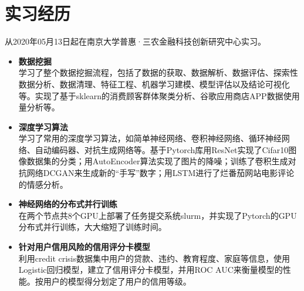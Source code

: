 \documentclass{resume}
\begin{document}
\section{实习经历}
从2020年05月13日起在南京大学普惠·三农金融科技创新研究中心实习。
\begin{itemize}%
\item \textbf{数据挖掘}\\
学习了整个数据挖掘流程，包括了数据的获取、数据解析、数据评估、探索性数据分析、数据清理、特征工程、机器学习建模、模型评估以及结论可视化等。实现了基于sklearn的消费顾客群体聚类分析、谷歌应用商店APP数据使用量分析等。
\item \textbf{深度学习算法}\\
学习了常用的深度学习算法，如简单神经网络、卷积神经网络、循环神经网络、自动编码器、对抗生成网络等。基于Pytorch库用ResNet实现了Cifar10图像数据集的分类；用AutoEncoder算法实现了图片的降噪；训练了卷积生成对抗网络DCGAN来生成新的“手写”数字；用LSTM进行了烂番茄网站电影评论的情感分析。
\item \textbf{神经网络的分布式并行训练}\\
在两个节点共8个GPU上部署了任务提交系统slurm，并实现了Pytorch的GPU分布式并行训练，大大缩短了训练时间。
\item \textbf{针对用户信用风险的信用评分卡模型}\\
利用credit crisis数据集中用户的贷款、违约、教育程度、家庭等信息，使用Logistic回归模型，建立了信用评分卡模型，并用ROC AUC来衡量模型的性能。按用户的模型得分划定了用户的信用等级。
\end{itemize}
\end{document}
